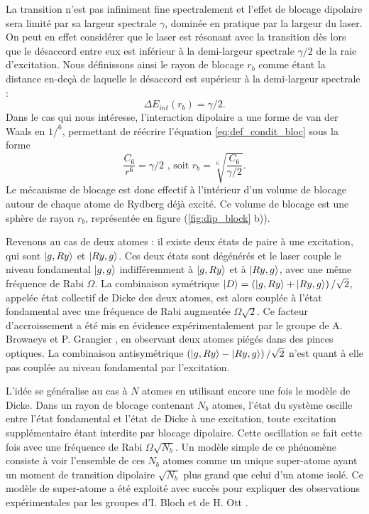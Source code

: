 La transition n'est pas infiniment fine spectralement et l'effet de blocage dipolaire sera limité par sa largeur spectrale $\gamma$, dominée en pratique par la largeur du laser.
On peut en effet considérer que le laser est résonant avec la transition dès lors que le désaccord entre eux est inférieur à la demi-largeur spectrale $\gamma/2$ de la raie d'excitation.
Nous définissons ainsi le \og rayon de blocage \fg{} $r_b$ comme étant la distance en-deçà de laquelle le désaccord est supérieur à la demi-largeur spectrale :
\begin{equation}
\label{eq:def_condit_bloc}
\Delta E_{int}(r_b) = \gamma /2 .
\end{equation}
%
Dans le cas qui nous intéresse, l'interaction dipolaire a une forme de van der Waals en $1/^6$, permettant de réécrire l'équation \eqref{eq:def_condit_bloc} sous la forme
\begin{equation}
\label{eq:def_rayon_bloc}
\frac{C_6}{r^6} = \gamma /2 \text{ , soit } r_b = \sqrt[6]{\frac{C_6}{\gamma /2}} .
\end{equation}
%
Le mécanisme de blocage est donc effectif à l'intérieur d'un \og volume de blocage\fg{} autour de chaque atome de Rydberg déjà excité.
Ce volume de blocage est une sphère de rayon $r_b$, représentée en figure (\ref{fig:dip_block} b)).

Revenons au cas de deux atomes :
il existe deux états de paire à une excitation, qui sont $\ket{g,Ry}$ et $\ket{Ry,g}$.
Ces deux états sont dégénérés et le laser couple le niveau fondamental $\ket{g,g}$ indifféremment à $\ket{g,Ry}$ et à $\ket{Ry,g}$, avec une même fréquence de Rabi $\Omega$.
La combinaison symétrique $\ket{D} = \left( \ket{g,Ry} + \ket{Ry,g} \right) / \sqrt{2}$, appelée état collectif de Dicke des deux atomes, est alors couplée à l'état fondamental avec une fréquence de Rabi augmentée $\Omega\sqrt{2}$.
Ce facteur d'accroissement a été mis en évidence expérimentalement par le groupe de A. Browaeys et P. Grangier \cite{MX_BROWAEYS_COLLECRABIBLOCK}, en observant deux atomes piégés dans des pinces optiques.
La combinaison antisymétrique $\left( \ket{g,Ry} - \ket{Ry,g} \right) / \sqrt{2}$ n'est quant à elle pas couplée au niveau fondamental par l'excitation.

L'idée se généralise au cas à $N$ atomes en utilisant encore une fois le modèle de Dicke.
Dans un rayon de blocage contenant $N_b$ atomes, l'état du système oscille entre l'état fondamental et l'état de Dicke à une excitation, toute excitation supplémentaire étant interdite par blocage dipolaire.
Cette oscillation se fait cette fois avec une fréquence de Rabi $\Omega\sqrt{N_b}$.
Un modèle simple de ce phénomène consiste à voir l'ensemble de ces $N_b$ atomes comme un unique \og super-atome \fg{} ayant un moment de transition dipolaire $\sqrt{N_b}$ plus grand  que celui d'un atome isolé.
Ce modèle de super-atome a été exploité avec succès pour expliquer des observations expérimentales par les groupes d'I. Bloch \cite{MX_BLOCH_SUPERATOM} et de H. Ott \cite{MX_OTT_SUPERATOM}.


